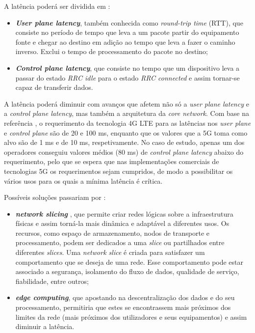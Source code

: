 \documentclass{llncs}
\begin{document}
A latência poderá ser dividida em :
\begin{itemize}
	\item \textit{\textbf{User plane latency}}, também conhecida como \textit{round-trip time} (RTT), que consiste no período de tempo que leva a um pacote partir do equipamento fonte e chegar ao destino em adição ao tempo que leva a fazer o caminho inverso. Exclui o tempo de processamento do pacote no destino;
	\item \textit{\textbf{Control plane latency}}, que consiste no tempo que um dispositivo leva a passar do estado \textit{RRC idle} para o estado \textit{RRC connected} e assim tornar-se capaz de transferir dados.
\end{itemize}

A latência poderá diminuir com avanços que afetem não só a \textit{user plane latency} e a \textit{control plane latency}, mas também a arquitetura da \textit{core network}. Com base na referência \cite{magazine}, o requerimento da tecnologia 4G LTE para as latências nos \textit{user plane} e \textit{control plane} são de 20 e 100 ms, enquanto que os valores que a 5G toma como alvo são de 1 ms e de 10 ms, respetivamente. No caso de estudo, apenas um dos operadores conseguiu valores médios (80 ms) de \textit{control plane latency} abaixo do requerimento, pelo que se espera que nas implementações comerciais de tecnologias 5G os requerimentos sejam cumpridos, de modo a possibilitar os vários usos para os quais a mínima latência é crítica.

Possíveis soluções passariam por :
\begin{itemize}
	\item \textit{\textbf{network slicing}} \cite{whitepaper}, que permite criar redes lógicas sobre a infraestrutura físicas e assim torná-la mais dinâmica e adaptável a diferentes usos. Os recursos, como espaço de armazenamento, nodos de transporte e processamento, podem ser dedicados a uma \textit{slice} ou partilhados entre diferentes \textit{slices}. Uma \textit{network slice} é criada para satisfazer um comportamento que se deseja de uma rede. Esse comportamento pode estar associado a segurança, isolamento do fluxo de dados, qualidade de serviço, fiabilidade, entre outros;
	\item \textit{\textbf{edge computing}}, que apostando na descentralização dos dados e do seu processamento, permitiria que estes se encontrassem mais próximos dos limites da rede (mais próximos dos utilizadores e seus equipamentos) e assim diminuir a latência.
\end{itemize}
\end{document}
